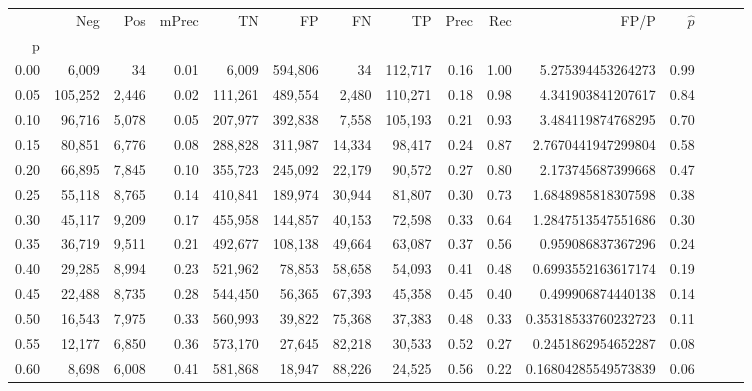 \begin{tabular}{rrrrrrrrrrrrrrr}
\toprule
{} &      Neg &    Pos & mPrec &       TN &       FP &       FN &       TP &  Prec &   Rec &                  FP/P & $\hat{p}$ \\
p    &          &        &       &          &          &          &          &       &       &                       &           \\
\midrule
0.00 &    6,009 &     34 &  0.01 &    6,009 &  594,806 &       34 &  112,717 &  0.16 &  1.00 &     5.275394453264273 &      0.99 \\
0.05 &  105,252 &  2,446 &  0.02 &  111,261 &  489,554 &    2,480 &  110,271 &  0.18 &  0.98 &     4.341903841207617 &      0.84 \\
0.10 &   96,716 &  5,078 &  0.05 &  207,977 &  392,838 &    7,558 &  105,193 &  0.21 &  0.93 &     3.484119874768295 &      0.70 \\
0.15 &   80,851 &  6,776 &  0.08 &  288,828 &  311,987 &   14,334 &   98,417 &  0.24 &  0.87 &    2.7670441947299804 &      0.58 \\
0.20 &   66,895 &  7,845 &  0.10 &  355,723 &  245,092 &   22,179 &   90,572 &  0.27 &  0.80 &     2.173745687399668 &      0.47 \\
0.25 &   55,118 &  8,765 &  0.14 &  410,841 &  189,974 &   30,944 &   81,807 &  0.30 &  0.73 &    1.6848985818307598 &      0.38 \\
0.30 &   45,117 &  9,209 &  0.17 &  455,958 &  144,857 &   40,153 &   72,598 &  0.33 &  0.64 &    1.2847513547551686 &      0.30 \\
0.35 &   36,719 &  9,511 &  0.21 &  492,677 &  108,138 &   49,664 &   63,087 &  0.37 &  0.56 &     0.959086837367296 &      0.24 \\
0.40 &   29,285 &  8,994 &  0.23 &  521,962 &   78,853 &   58,658 &   54,093 &  0.41 &  0.48 &    0.6993552163617174 &      0.19 \\
0.45 &   22,488 &  8,735 &  0.28 &  544,450 &   56,365 &   67,393 &   45,358 &  0.45 &  0.40 &     0.499906874440138 &      0.14 \\
0.50 &   16,543 &  7,975 &  0.33 &  560,993 &   39,822 &   75,368 &   37,383 &  0.48 &  0.33 &   0.35318533760232723 &      0.11 \\
0.55 &   12,177 &  6,850 &  0.36 &  573,170 &   27,645 &   82,218 &   30,533 &  0.52 &  0.27 &    0.2451862954652287 &      0.08 \\
0.60 &    8,698 &  6,008 &  0.41 &  581,868 &   18,947 &   88,226 &   24,525 &  0.56 &  0.22 &   0.16804285549573839 &      0.06 \\

\end{tabular}
